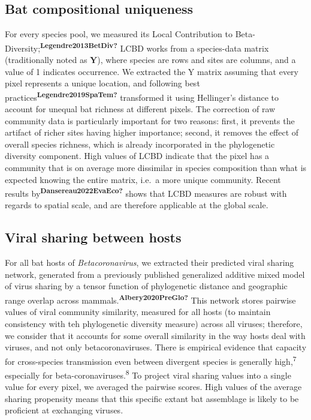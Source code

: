 \documentclass[10pt,oneside]{article}
\begin{document}
\hypertarget{bat-compositional-uniqueness}{%
\subsection{Bat compositional
uniqueness}\label{bat-compositional-uniqueness}}

For every species pool, we measured its Local Contribution to
Beta-Diversity;\textsuperscript{\textbf{Legendre2013BetDiv?}} LCBD works
from a species-data matrix (traditionally noted as \(\mathbf{Y}\)),
where species are rows and sites are columns, and a value of 1 indicates
occurrence. We extracted the Y matrix assuming that every pixel
represents a unique location, and following best
practices\textsuperscript{\textbf{Legendre2019SpaTem?}} transformed it
using Hellinger's distance to account for unequal bat richness at
different pixels. The correction of raw community data is particularly
important for two reasons: first, it prevents the artifact of richer
sites having higher importance; second, it removes the effect of overall
species richness, which is already incorporated in the phylogenetic
diversity component. High values of LCBD indicate that the pixel has a
community that is on average more dissimilar in species composition than
what is expected knowing the entire matrix, i.e.~a more unique
community. Recent results
by\textsuperscript{\textbf{Dansereau2022EvaEco?}} shows that LCBD
measures are robust with regards to spatial scale, and are therefore
applicable at the global scale.

\hypertarget{viral-sharing-between-hosts}{%
\subsection{Viral sharing between
hosts}\label{viral-sharing-between-hosts}}

For all bat hosts of \emph{Betacoronavirus}, we extracted their
predicted viral sharing network, generated from a previously published
generalized additive mixed model of virus sharing by a tensor function
of phylogenetic distance and geographic range overlap across
mammals.\textsuperscript{\textbf{Albery2020PreGlo?}} This network stores
pairwise values of viral community similarity, measured for all hosts
(to maintain consistency with teh phylogenetic diversity measure) across
all viruses; therefore, we consider that it accounts for some overall
similarity in the way hosts deal with viruses, and not only
betacoronaviruses. There is empirical evidence that capacity for
cross-species transmission even between divergent species is generally
high,\textsuperscript{7} especially for
beta-coronaviruses.\textsuperscript{8} To project viral sharing values
into a single value for every pixel, we averaged the pairwise scores.
High values of the average sharing propensity means that this specific
extant bat assemblage is likely to be proficient at exchanging viruses.
\end{document}
